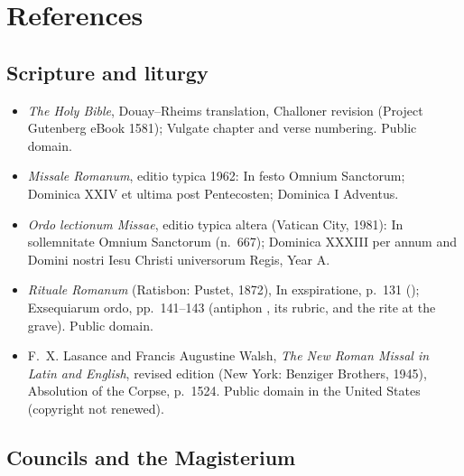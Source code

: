 \section{References}

\begingroup
\linespread{1}\selectfont
\setlength{\parskip}{0pt}
\titlespacing*{\subsection}{0pt}{0.3ex}{0.3ex}

\subsection*{Scripture and liturgy}

{\fontsize{8.6}{9.6}\selectfont
\begin{itemize}[itemsep=0pt,parsep=0pt,topsep=0.05em]
\item \emph{The Holy Bible}, Douay--Rheims translation, Challoner revision (Project Gutenberg eBook 1581); Vulgate chapter and verse numbering. Public domain.
\item \emph{Missale Romanum}, editio typica 1962: In festo Omnium Sanctorum; Dominica XXIV et ultima post Pentecosten; Dominica I Adventus.
\item \emph{Ordo lectionum Missae}, editio typica altera (Vatican City, 1981): In sollemnitate Omnium Sanctorum (n.~667); Dominica XXXIII per annum and Domini nostri Iesu Christi universorum Regis, Year A.
\item \emph{Rituale Romanum} (Ratisbon: Pustet, 1872), In exspiratione, p.~131 (); Exsequiarum ordo, pp.~141--143 (antiphon , its rubric, and the rite at the grave). Public domain.
\item F.~X. Lasance and Francis Augustine Walsh, \emph{The New Roman Missal in Latin and English}, revised edition (New York: Benziger Brothers, 1945), Absolution of the Corpse, p.~1524. Public domain in the United States (copyright not renewed).
\end{itemize}}

\subsection*{Councils and the Magisterium}

